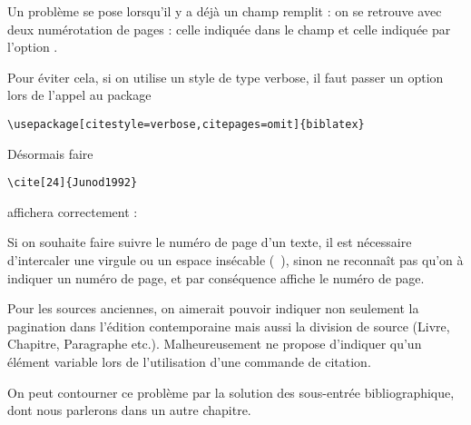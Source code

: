 Un problème se pose lorsqu'il y a déjà un champ  remplit : on se retrouve avec deux numérotation de pages : celle indiquée dans le champ  et celle indiquée par l'option .


\begin{quotation}
\cite[p. 24]{Junod1992}
\end{quotation}



Pour éviter cela, si on utilise un style de type verbose, il faut passer un option lors de l'appel au package 

\begin{verbatim}
\usepackage[citestyle=verbose,citepages=omit]{biblatex}
\end{verbatim}

Désormais faire
\begin{verbatim}
\cite[24]{Junod1992}
\end{verbatim}

affichera correctement :

\begin{quotation}
\cite[24]{Junod1992}
\end{quotation}

Si on souhaite faire suivre le numéro de page d'un texte, il est nécessaire d'intercaler une virgule ou un espace insécable (~), sinon  ne reconnaît pas qu'on à indiquer un numéro de page, et par conséquence affiche le numéro de page.

\begin{quotation}
\cite[24, passage au demeurant fort intéressant.]{Junod1992}
\end{quotation}


\begin{quotation}
\cite[24, passage au demeurant fort intéressant.]{Junod1992}
\end{quotation}

\begin{attention}
Pour les sources anciennes, on aimerait pouvoir indiquer non seulement la pagination dans l'édition contemporaine mais aussi la division de source (Livre, Chapitre, Paragraphe etc.). Malheureusement  ne propose d'indiquer qu'un élément variable lors de l'utilisation d'une commande de citation.

On peut contourner ce problème par la solution des sous-entrée bibliographique, dont nous parlerons dans un autre chapitre. 
\end{attention}

